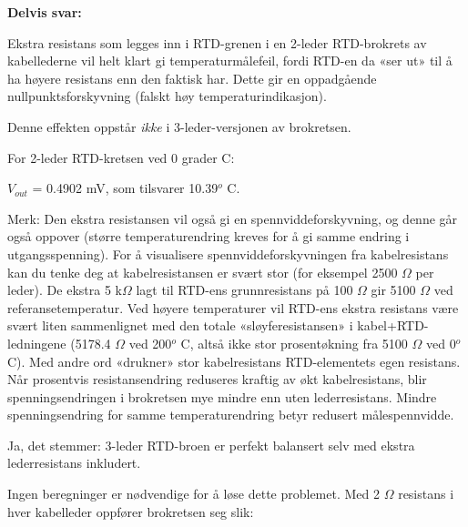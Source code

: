 





\noindent
{\bf Delvis svar:}

Ekstra resistans som legges inn i RTD-grenen i en 2-leder RTD-brokrets av kabellederne vil helt klart gi temperaturmålefeil, fordi RTD-en da «ser ut» til å ha høyere resistans enn den faktisk har. Dette gir en oppadgående nullpunktsforskyvning (falskt høy temperaturindikasjon).

\vskip 10pt

Denne effekten oppstår {\it ikke} i 3-leder-versjonen av brokretsen.







For 2-leder RTD-kretsen ved 0 grader C:

\vskip 10pt

$V_{out}$ = 0.4902 mV, som tilsvarer 10.39$^{o}$ C.

\vskip 10pt

Merk: Den ekstra resistansen vil også gi en spennviddeforskyvning, og denne går også oppover (større temperaturendring kreves for å gi samme endring i utgangsspenning). For å visualisere spennviddeforskyvningen fra kabelresistans kan du tenke deg at kabelresistansen er svært stor (for eksempel 2500 $\Omega$ per leder). De ekstra 5 k$\Omega$ lagt til RTD-ens grunnresistans på 100 $\Omega$ gir 5100 $\Omega$ ved referansetemperatur. Ved høyere temperaturer vil RTD-ens ekstra resistans være svært liten sammenlignet med den totale «sløyferesistansen» i kabel+RTD-ledningene (5178.4 $\Omega$ ved 200$^{o}$ C, altså ikke stor prosentøkning fra 5100 $\Omega$ ved 0$^{o}$ C). Med andre ord «drukner» stor kabelresistans RTD-elementets egen resistans. Når prosentvis resistansendring reduseres kraftig av økt kabelresistans, blir spenningsendringen i brokretsen mye mindre enn uten lederresistans. Mindre spenningsendring for samme temperaturendring betyr redusert målespennvidde.

\vskip 10pt

Ja, det stemmer: 3-leder RTD-broen er perfekt balansert selv med ekstra lederresistans inkludert.

\vskip 10pt

Ingen beregninger er nødvendige for å løse dette problemet. Med 2 $\Omega$ resistans i hver kabelleder oppfører brokretsen seg slik:

